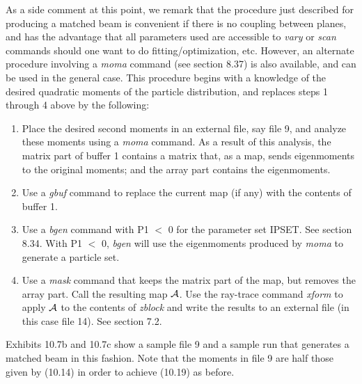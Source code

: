 As a side comment at this point, we remark that the procedure just
described for producing a matched beam is convenient if there is no
coupling between planes, and has the advantage that all parameters used
are accessible to {\em vary} or {\em scan} commands should one want to do
fitting/optimization, etc.  However, an alternate procedure involving a
{\em moma} command (see section 8.37) is also available, and can be used
in the general case.  This procedure begins with a knowledge of the
desired quadratic moments of the particle distribution, and replaces
steps 1 through 4 above by the following:
\renewcommand{\labelenumi}{\theenumi$^{\prime}$.}
\begin{enumerate}
\item Place the desired second moments in an external file, say file 9,
and analyze these moments using a {\em moma} command.  As a result of this
analysis, the matrix part of buffer 1 contains a matrix that, as a map,
sends eigenmoments to the original moments; and the array part contains the eigenmoments.

\item Use a {\em gbuf} command to replace the current map (if any) with
the contents of buffer 1.

\item Use a {\em bgen} command with P1 $<$ 0 for the parameter set IPSET.
See section 8.34.  With P1 $<$ 0, {\em bgen} will use the eigenmoments
produced by {\em moma} to generate a particle set.

\item Use a {\em mask} command that keeps the matrix part of the map, but
removes the array part.  Call the resulting map ${\cal A}$.
Use the ray-trace command {\em xform} to apply ${\cal A}$ to the contents
of {\em zblock} and write the results to an external file (in this case
file 14).  See section 7.2.
\end{enumerate}
\renewcommand{\labelenumi}{\theenumi.}
Exhibits 10.7b and 10.7c show a sample file 9 and a sample \Mary run that
generates a matched beam in this fashion.  Note that the moments in file
9 are half those given by (10.14) in order to achieve (10.19) as before.

